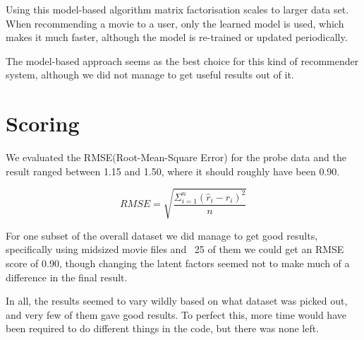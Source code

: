 	Using this model-based algorithm matrix factorisation scales to larger data set. When recommending a movie to a user, only the learned model is used, which makes it much faster, although the model is re-trained or updated periodically.
	
	The model-based approach seems as the best choice for this kind of recommender system, although we did not manage to get useful results out of it.
	
	\section{Scoring}
	We evaluated the RMSE(Root-Mean-Square Error) for the probe data and the result ranged between 1.15 and 1.50, where it should roughly have been 0.90.
	
	$$RMSE = \sqrt{\frac{\Sigma_{i = 1}^{n} (\hat{r}_i - r_i)^2}{n}}$$
	
	For one subset of the overall dataset we did manage to get good results, specifically using midsized movie files and ~25 of them we could get an RMSE score of 0.90, though changing the latent factors seemed not to make much of a difference in the final result.
	
	In all, the results seemed to vary wildly based on what dataset was picked out, and very few of them gave good results. 
	To perfect this, more time would have been required to do different things in the code, but there was none left.


